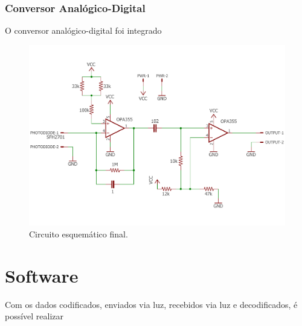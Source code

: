 		\subsubsection{Conversor Analógico-Digital}
		
		O conversor analógico-digital foi integrado 
	
		\begin{figure}[htb]
			\caption{\label{fig_receiver_lify_circuit_final} Circuito esquemático final.}
			\centering
			\includegraphics[width=1\textwidth, trim={0cm 1cm 0cm 1cm}, clip]{circuits/receiver_lify_final.pdf}
		\end{figure}
	
		\section{Software}
		Com os dados codificados, enviados via luz, recebidos via luz e decodificados, é possível realizar 